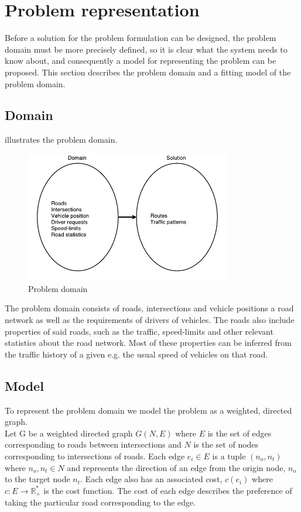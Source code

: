 \section{Problem representation}
Before a solution for the problem formulation can be designed, the problem domain must be more precisely defined, so it is clear what the system needs to know about, and consequently a model for representing the problem can be proposed. This section describes the problem domain and a fitting model of the problem domain.

\subsection*{Domain}
 illustrates the problem domain. 
\begin{figure}[h!]
  \centering
    \includegraphics[width=0.8\textwidth]{figures/pd.pdf}
    \caption{Problem domain}
    \label{fig:problem-domain}
\end{figure}
The problem domain consists of roads, intersections and vehicle positions a road network as well as the requirements of drivers of vehicles. The roads also include properties of said roads, such as the traffic, speed-limits and other relevant statistics about the road network. Most of these properties can be inferred from the traffic history of a given e.g. the usual speed of vehicles on that road.

\subsection*{Model}
To represent the problem domain we model the problem as a weighted, directed graph. \\
Let G be a weighted directed graph $G(N,E)$ where $E$ is the set of edges corresponding to roads between intersections and $N$ is the set of nodes corresponding to intersections of roads. Each edge $e_i \in E$ is a tuple $(n_o, n_t)$ where $n_o, n_t \in N$ and represents the direction of an edge from the origin node, $n_o$ to the target node $n_t$. Each edge also has an associated cost, $c(e_i)$ where  $c: E \rightarrow \mathbb R_+^*$ is the cost function. The cost of each edge describes the preference of taking the particular road corresponding to the edge. 

